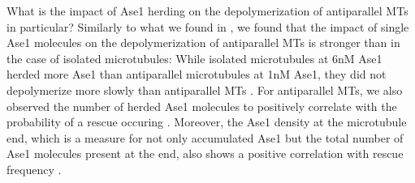 What is the impact of Ase1 herding on the depolymerization of antiparallel MTs in particular? Similarly to what we found in , we found that the impact of single Ase1 molecules on the depolymerization of antiparallel MTs is stronger than in the case of isolated microtubules: While isolated microtubules at 6nM Ase1 herded more Ase1 than antiparallel microtubules at 1nM Ase1, they did not depolymerize more slowly than antiparallel MTs . For antiparallel MTs, we also observed the number of herded Ase1 molecules to positively correlate with the probability of a rescue occuring . Moreover, the Ase1 density at the microtubule end, which is a measure for not only accumulated Ase1 but the total number of Ase1 molecules present at the end, also shows a positive correlation with rescue frequency .\par

